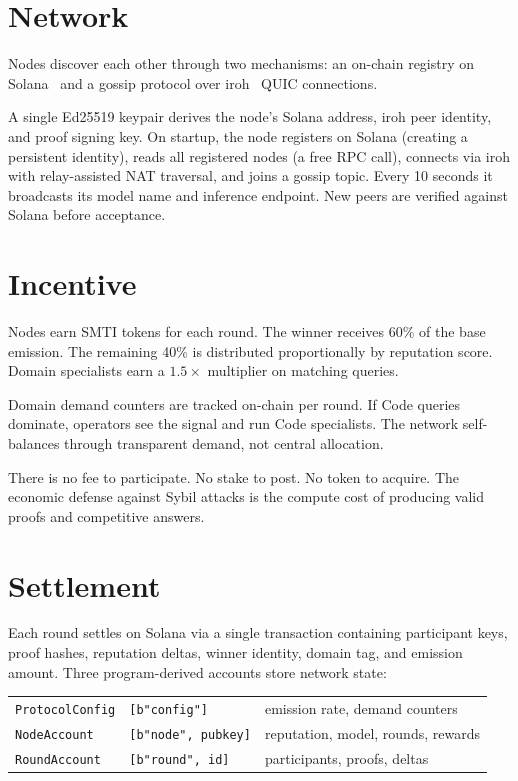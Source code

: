 \documentclass[11pt,a4paper]{article}
\begin{document}
\section{Network}

Nodes discover each other through two mechanisms: an on-chain registry on Solana~\cite{solana} and a gossip protocol over iroh~\cite{iroh} QUIC connections.

A single Ed25519 keypair derives the node's Solana address, iroh peer identity, and proof signing key. On startup, the node registers on Solana (creating a persistent identity), reads all registered nodes (a free RPC call), connects via iroh with relay-assisted NAT traversal, and joins a gossip topic. Every 10 seconds it broadcasts its model name and inference endpoint. New peers are verified against Solana before acceptance.

\section{Incentive}

Nodes earn SMTI tokens for each round. The winner receives 60\% of the base emission. The remaining 40\% is distributed proportionally by reputation score. Domain specialists earn a $1.5\times$ multiplier on matching queries.

Domain demand counters are tracked on-chain per round. If Code queries dominate, operators see the signal and run Code specialists. The network self-balances through transparent demand, not central allocation.

There is no fee to participate. No stake to post. No token to acquire. The economic defense against Sybil attacks is the compute cost of producing valid proofs and competitive answers.

\section{Settlement}

Each round settles on Solana via a single transaction containing participant keys, proof hashes, reputation deltas, winner identity, domain tag, and emission amount. Three program-derived accounts store network state:

\begin{center}
\begin{tabular}{@{}lll@{}}
\toprule
\texttt{ProtocolConfig} & \texttt{[b"config"]} & emission rate, demand counters \\
\texttt{NodeAccount} & \texttt{[b"node", pubkey]} & reputation, model, rounds, rewards \\
\texttt{RoundAccount} & \texttt{[b"round", id]} & participants, proofs, deltas \\
\bottomrule
\end{tabular}
\end{center}
\end{document}
